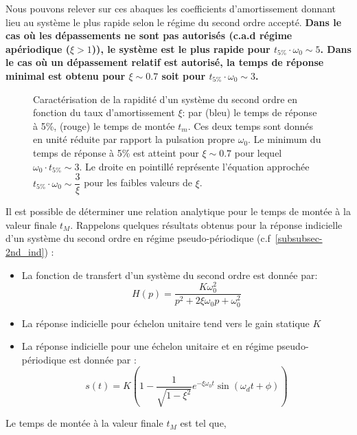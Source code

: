 Nous pouvons relever sur ces abaques les coefficients d'amortissement donnant
lieu au système le plus rapide selon le régime du second ordre accepté.
\textbf{Dans le cas où les dépassements ne sont pas autorisés (c.a.d régime 
apériodique ($\xi>1$)), le système est le plus rapide pour 
$t_{5\%}\cdot\omega_0\sim5$. Dans le cas où un dépassement relatif est 
autorisé, la temps de réponse minimal est obtenu pour $\xi\sim 0.7$ soit
pour $t_{5\%}\cdot\omega_0\sim3$.}
\begin{figure}
    \centering
    
    \caption{Caractérisation de la rapidité d'un système du second ordre en
             fonction du taux d'amortissement $\xi$: par
             (bleu) le temps de réponse à 5\%,  
             (rouge) le temps de montée $t_m$.
             Ces deux temps sont donnés en unité réduite
             par rapport la pulsation propre $\omega_0$.
             Le minimum du temps de réponse à 5\% est atteint pour $\xi\sim0.7$ 
             pour lequel $\omega_0\cdot t_{5\%}\sim3$.
             Le droite en pointillé représente l'équation approchée 
             $t_{5\%}\cdot\omega_0\sim\dfrac{3}{\xi}$ pour les faibles valeurs 
             de $\xi$.
             \label{fig-2nd_temps_reponse_1}}
\end{figure}
\clearpage
Il est possible de déterminer une relation analytique pour le temps
de montée à la valeur finale $t_{M}$. Rappelons quelques résultats obtenus
pour la réponse indicielle d'un système du second ordre en régime 
pseudo-périodique (c.f~\cref{subsubsec-2nd_ind}) :
\begin{itemize}
\item La fonction de transfert d'un système du second ordre est donnée
par:
$$
H(p)=\dfrac{K\omega_0^2}{p^2+2\xi\omega_0p+\omega_0^2}
$$
\item La réponse indicielle pour échelon unitaire tend vers 
      le gain statique $K$ 
\item La réponse indicielle pour une échelon unitaire et en régime 
      pseudo-périodique est donnée par : 
$$
    s(t) = K \left( 1 - 
           \dfrac{1}{\sqrt{1-\xi^2}} 
           e^{-\xi\omega_0 t}
           \sin{(\omega_d t+\phi)}\right)\label{eq-2-3_2nd} 
$$
\end{itemize}
Le temps de montée à la valeur finale $t_{M}$ est tel que, 
